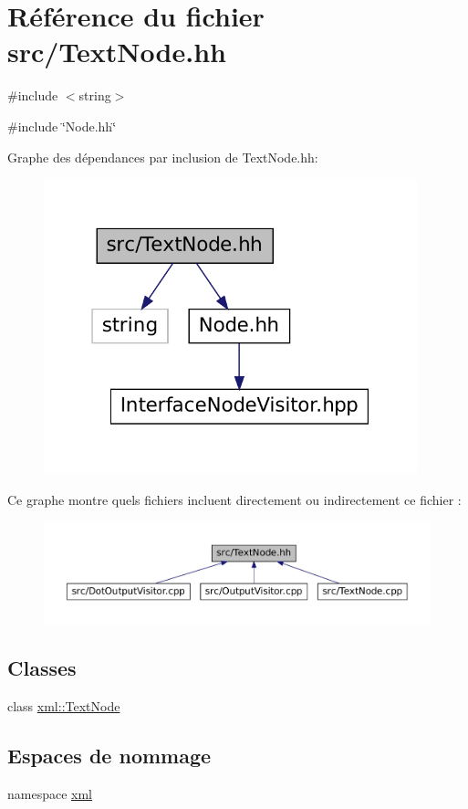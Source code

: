 \hypertarget{_text_node_8hh}{
\section{Référence du fichier src/TextNode.hh}
\label{_text_node_8hh}
}
{\ttfamily \#include $<$string$>$}\par
{\ttfamily \#include \char`\"{}Node.hh\char`\"{}}\par
Graphe des dépendances par inclusion de TextNode.hh:
\nopagebreak
\begin{figure}[H]
\begin{center}
\leavevmode
\includegraphics[width=307pt]{_text_node_8hh__incl}
\end{center}
\end{figure}
Ce graphe montre quels fichiers incluent directement ou indirectement ce fichier :
\nopagebreak
\begin{figure}[H]
\begin{center}
\leavevmode
\includegraphics[width=400pt]{_text_node_8hh__dep__incl}
\end{center}
\end{figure}
\subsection*{Classes}
\begin{DoxyCompactItemize}
\item 
class \hyperlink{classxml_1_1_text_node}{xml::TextNode}
\end{DoxyCompactItemize}
\subsection*{Espaces de nommage}
\begin{DoxyCompactItemize}
\item 
namespace \hyperlink{namespacexml}{xml}
\end{DoxyCompactItemize}
